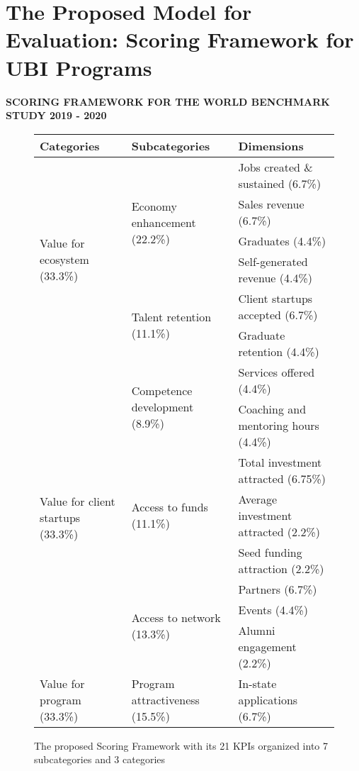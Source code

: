 \documentclass[../Main.tex]{subfiles}
\begin{document}
	\section{The Proposed  Model for Evaluation: Scoring Framework for UBI Programs}

	\def\arraystretch{1.2} %

\begin{center}
\textbf{SCORING FRAMEWORK FOR THE WORLD BENCHMARK STUDY 2019 - 2020}
\end{center}

\begin{figure}[H]
\centering
\caption{The proposed Scoring Framework with its 21 KPIs organized into 7 subcategories and 3 categories}
\label{tab:scoring_framework}
\begin{tabular}{|p{}|p{}|p{}|}
\hline
\textbf{Categories} & \textbf{Subcategories} & \textbf{Dimensions} \\
\hline
\multirow{6}{=}{Value for ecosystem (33.3\%)} & \multirow{4}{=}{Economy enhancement (22.2\%)} & Jobs created \& sustained (6.7\%) \\
\cline{3-3}
& & Sales revenue (6.7\%) \\
\cline{3-3}
& & Graduates (4.4\%) \\
\cline{3-3}
& & Self-generated revenue (4.4\%) \\
\cline{2-3}
& \multirow{2}{=}{Talent retention (11.1\%)} & Client startups accepted (6.7\%) \\
\cline{3-3}
& & Graduate retention (4.4\%) \\
\hline
\multirow{8}{=}{Value for client startups (33.3\%)} & \multirow{2}{=}{Competence development (8.9\%)} & Services offered (4.4\%) \\
\cline{3-3}
& & Coaching and mentoring hours (4.4\%) \\
\cline{2-3}
& \multirow{3}{=}{Access to funds (11.1\%)} & Total investment attracted (6.75\%) \\
\cline{3-3}
& & Average investment attracted (2.2\%) \\
\cline{3-3}
& & Seed funding attraction (2.2\%) \\
\cline{2-3}
& \multirow{3}{=}{Access to network (13.3\%)} & Partners (6.7\%) \\
\cline{3-3}
& & Events (4.4\%) \\
\cline{3-3}
& & Alumni engagement (2.2\%) \\
\hline
\multirow{7}{=}{Value for program (33.3\%)} & \multirow{3}{=}{Program attractiveness (15.5\%)} & In-state applications (6.7\%) \\

\end{tabular}
\end{figure}
\end{document}
